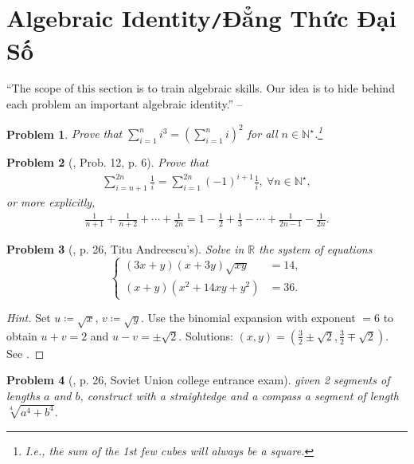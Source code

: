 \documentclass[oneside]{book}
\numberwithin{equation}{section}
\newtheorem{problem}{Problem}[section]
\begin{document}
\section{Algebraic Identity\texttt{/}Đẳng Thức Đại Số}
``The scope of this section is to train algebraic skills. Our idea is to hide behind each problem an important algebraic identity.'' -- \cite[Subsect. 2.1.1, p. 25]{Gelca_Andreescu2017}

\begin{problem}
	Prove that $\sum_{i=1}^n i^3 = \left(\sum_{i=1}^n i\right)^2$ for all $n\in\mathbb{N}^\star$.\footnote{I.e., the sum of the 1st few cubes will always be a square.}
\end{problem}

\begin{problem}[\cite{Gelca_Andreescu2017}, Prob. 12, p. 6] Prove that
	\begin{align*}
		\sum_{i=n+1}^{2n} \frac{1}{i} = \sum_{i=1}^{2n} (-1)^{i+1}\frac{1}{i},\ \forall n\in\mathbb{N}^\star,
	\end{align*}
	or more explicitly,
	\begin{align*}
		\frac{1}{n + 1} + \frac{1}{n + 2} + \cdots + \frac{1}{2n} = 1 - \frac{1}{2} + \frac{1}{3} - \cdots + \frac{1}{2n - 1} - \frac{1}{2n}.
	\end{align*}
\end{problem}

\begin{problem}[\cite{Gelca_Andreescu2017}, p. 26, Titu Andreescu's]
	Solve in $\mathbb{R}$ the system of equations
	\begin{equation*}
		\left\{\begin{split}
			(3x + y)(x + 3y)\sqrt{xy} &= 14,\\
			(x + y)(x^2 + 14xy + y^2) &= 36.
		\end{split}\right.
	\end{equation*}
\end{problem}

\begin{proof}[Hint]
	Set $u\coloneqq\sqrt{x}$, $v\coloneqq\sqrt{y}$. Use the binomial expansion with exponent $= 6$ to obtain $u + v = 2$ and $u - v = \pm\sqrt{2}$. Solutions: $(x,y) = \left(\frac{3}{2}\pm\sqrt{2},\frac{3}{2}\mp\sqrt{2}\right)$. See \cite[p. 26]{Gelca_Andreescu2017}.
\end{proof}

\begin{problem}[\cite{Gelca_Andreescu2017}, p. 26, Soviet Union college entrance exam]
	given 2 segments of lengths $a$ and $b$, construct with a straightedge and a compass a segment of length $\sqrt[4]{a^4 + b^4}$.
\end{problem}
\end{document}
